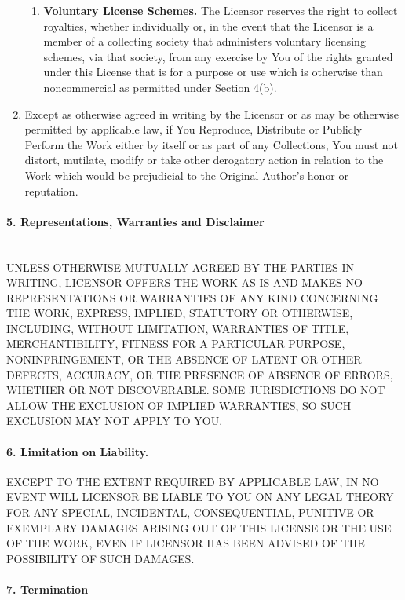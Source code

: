 \begin{enumerate}
\begin{enumerate}
  \item \textbf{Voluntary License Schemes.} The Licensor reserves the right to collect royalties, whether individually or, in the event that the Licensor is a member of a collecting society that administers voluntary licensing schemes, via that society, from any exercise by You of the rights granted under this License that is for a purpose or use which is otherwise than noncommercial as permitted under Section 4(b).
\end{enumerate}
\item Except as otherwise agreed in writing by the Licensor or as may be otherwise permitted by applicable law, if You Reproduce, Distribute or Publicly Perform the Work either by itself or as part of any Collections, You must not distort, mutilate, modify or take other derogatory action in relation to the Work which would be prejudicial to the Original Author's honor or reputation.
\end{enumerate}

\paragraph{5. Representations, Warranties and Disclaimer}
\ \\
UNLESS OTHERWISE MUTUALLY AGREED BY THE PARTIES IN WRITING, LICENSOR OFFERS THE WORK AS-IS AND MAKES NO REPRESENTATIONS OR WARRANTIES OF ANY KIND CONCERNING THE WORK, EXPRESS, IMPLIED, STATUTORY OR OTHERWISE, INCLUDING, WITHOUT LIMITATION, WARRANTIES OF TITLE, MERCHANTIBILITY, FITNESS FOR A PARTICULAR PURPOSE, NONINFRINGEMENT, OR THE ABSENCE OF LATENT OR OTHER DEFECTS, ACCURACY, OR THE PRESENCE OF ABSENCE OF ERRORS, WHETHER OR NOT DISCOVERABLE. SOME JURISDICTIONS DO NOT ALLOW THE EXCLUSION OF IMPLIED WARRANTIES, SO SUCH EXCLUSION MAY NOT APPLY TO YOU.

\paragraph{6. Limitation on Liability.} EXCEPT TO THE EXTENT REQUIRED BY APPLICABLE LAW, IN NO EVENT WILL LICENSOR BE LIABLE TO YOU ON ANY LEGAL THEORY FOR ANY SPECIAL, INCIDENTAL, CONSEQUENTIAL, PUNITIVE OR EXEMPLARY DAMAGES ARISING OUT OF THIS LICENSE OR THE USE OF THE WORK, EVEN IF LICENSOR HAS BEEN ADVISED OF THE POSSIBILITY OF SUCH DAMAGES.

\paragraph{7. Termination}

